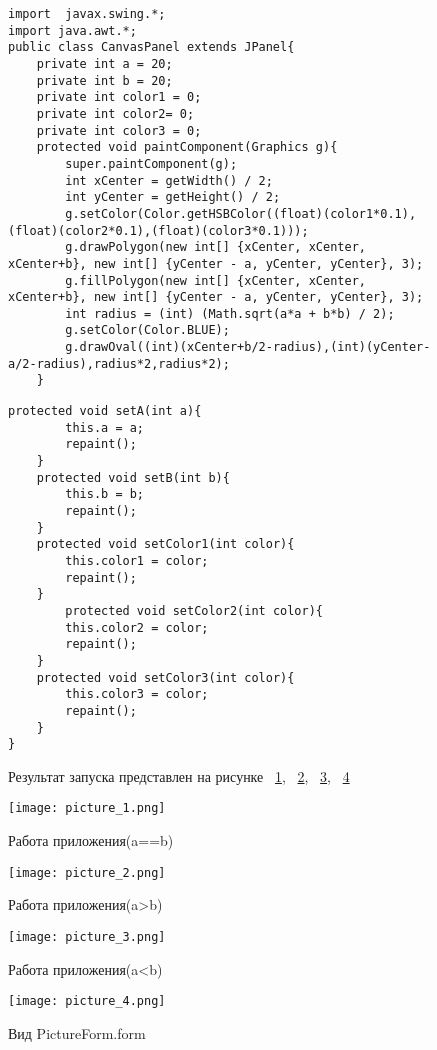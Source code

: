 \documentclass[a4paper, 14pt]{extarticle}
\begin{document}
\begin{figure}[!htb]
\begin{lstlisting}[language={},caption={класс CanvasPanel},label={lst:code3}]
import  javax.swing.*;
import java.awt.*;
public class CanvasPanel extends JPanel{
    private int a = 20;
    private int b = 20;
    private int color1 = 0;
    private int color2= 0;
    private int color3 = 0;
    protected void paintComponent(Graphics g){
        super.paintComponent(g);
        int xCenter = getWidth() / 2;
        int yCenter = getHeight() / 2;
        g.setColor(Color.getHSBColor((float)(color1*0.1),(float)(color2*0.1),(float)(color3*0.1)));
        g.drawPolygon(new int[] {xCenter, xCenter, xCenter+b}, new int[] {yCenter - a, yCenter, yCenter}, 3);
        g.fillPolygon(new int[] {xCenter, xCenter, xCenter+b}, new int[] {yCenter - a, yCenter, yCenter}, 3);
        int radius = (int) (Math.sqrt(a*a + b*b) / 2);
        g.setColor(Color.BLUE);
        g.drawOval((int)(xCenter+b/2-radius),(int)(yCenter-a/2-radius),radius*2,radius*2);
    }
\end{lstlisting}
\end{figure}

\begin{figure}[!htb]
\begin{lstlisting}[language={},caption={класс CanvasPanel(продолжение)},label={lst:code4}]
    protected void setA(int a){
        this.a = a;
        repaint();
    }
    protected void setB(int b){
        this.b = b;
        repaint();
    }
    protected void setColor1(int color){
        this.color1 = color;
        repaint();
    }
        protected void setColor2(int color){
        this.color2 = color;
        repaint();
    }
    protected void setColor3(int color){
        this.color3 = color;
        repaint();
    }
}
\end{lstlisting}
\end{figure}

\begin{figure}[!htb]
Результат запуска представлен на рисунке ~\ref{fig:picture_1.png}, ~\ref{fig:picture_2.png}, ~\ref{fig:picture_3.png}, ~\ref{fig:picture_4.png}
\end{figure}

\begin{figure}[!htb]
	\centering
	\texttt{[image: picture\_1.png]}
\caption{Работа приложения(a==b)}
\label{fig:picture_1.png}
\end{figure}

\begin{figure}[!htb]
	\centering
	\texttt{[image: picture\_2.png]}
\caption{Работа приложения(a>b)}
\label{fig:picture_2.png}
\end{figure}

\begin{figure}[!htb]
	\centering
	\texttt{[image: picture\_3.png]}
\caption{Работа приложения(a<b)}
\label{fig:picture_3.png}
\end{figure}

\begin{figure}[!htb]
	\centering
	\texttt{[image: picture\_4.png]}
\caption{Вид PictureForm.form}
\label{fig:picture_4.png}
\end{figure}
\end{document}
